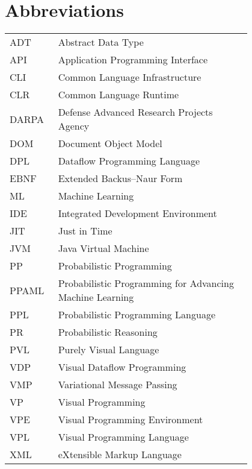 \chapter*{Abbreviations}

\begin{flushleft}
\begin{tabular}{l p{0.8\linewidth}}
ADT      & Abstract Data Type\\
API      & Application Programming Interface\\
CLI      & Common Language Infrastructure\\
CLR      & Common Language Runtime\\
DARPA    & Defense Advanced Research Projects Agency\\
DOM      & Document Object Model\\
DPL      & Dataflow Programming Language\\
EBNF     & Extended Backus–Naur Form\\
ML       & Machine Learning\\
IDE      & Integrated Development Environment\\
JIT      & Just in Time\\
JVM      & Java Virtual Machine\\
PP       & Probabilistic Programming\\
PPAML    & Probabilistic Programming for Advancing Machine Learning\\
PPL      & Probabilistic Programming Language\\
PR       & Probabilistic Reasoning\\
PVL      & Purely Visual Language\\
VDP      & Visual Dataflow Programming\\
VMP      & Variational Message Passing\\
VP       & Visual Programming\\
VPE      & Visual Programming Environment\\
VPL      & Visual Programming Language\\
XML      & eXtensible Markup Language
\end{tabular}
\end{flushleft}
